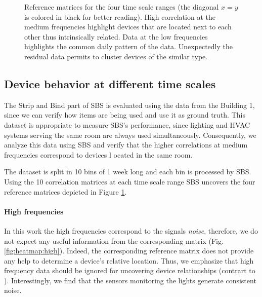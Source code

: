 \begin{figure}[t!]
\caption{Reference matrices for the four time scale ranges (the diagonal $x=y$ is colored in black for better reading). High correlation at the medium frequencies highlight devices that are located next to each other thus intrinsically related. Data at the low frequencies highlights the common daily pattern of the data. Unexpectedly the residual data permits to cluster devices of the similar type.}
\label{fig:heatmap}
\end{figure}

\subsection{Device behavior at different time scales}
The Strip and Bind part of SBS is evaluated using the data from the Building 1, since we can verify how items are being 
used and use it as ground truth.
This dataset is appropriate to measure SBS's performance, since lighting and HVAC systems serving the same room are always used 
simultaneously.
Consequently, we analyze this data using SBS and verify that the higher correlations at medium frequencies correspond to devices l
ocated in the same room. %

The dataset is split in 10 bins of 1 week long and each bin is processed by SBS.
Using the 10 correlation matrices at each time scale range SBS uncovers the four reference matrices depicted in 
Figure \ref{fig:heatmap}.

\paragraph{High frequencies}
In this work the high frequencies correspond to the signals \emph{noise}, 
therefore, we do not expect any useful information from the corresponding matrix (Fig. \ref{fig:heatmap:high}).
Indeed, the corresponding reference matrix does not provide any help to determine a device's relative location.
Thus, we emphasize that high frequency data should be ignored for uncovering device relationships (contrart to \cite{romain:iotapp12}).
Interestingly, we find that the sensors monitoring the lights generate consistent noise. %
  

